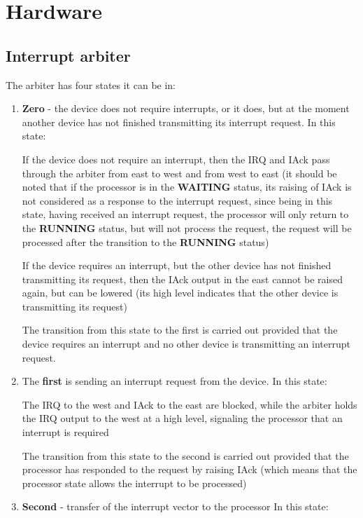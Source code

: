 \chapter*{Hardware}

\section*{Interrupt arbiter}

The arbiter has four states it can be in:

\begin{enumerate}
	\item \textbf{Zero} - the device does not require interrupts, or it does, but at the moment another device has not finished transmitting its interrupt request. In this state:

		If the device does not require an interrupt, then the IRQ and IAck pass through the arbiter from east to west and from west to east (it should be noted that if the processor is in the \textbf{WAITING} status, its raising of IAck is not considered as a response to the interrupt request, since being in this state, having received an interrupt request, the processor will only return to the \textbf{RUNNING} status, but will not process the request, the request will be processed after the transition to the \textbf{RUNNING} status)

		If the device requires an interrupt, but the other device has not finished transmitting its request, then the IAck output in the east cannot be raised again, but can be lowered (its high level indicates that the other device is transmitting its request)

		The transition from this state to the first is carried out provided that the device requires an interrupt and no other device is transmitting an interrupt request.
	\item The \textbf{first} is sending an interrupt request from the device.
		In this state:

		The IRQ to the west and IAck to the east are blocked, while the arbiter holds the IRQ output to the west at a high level, signaling the processor that an interrupt is required

		The transition from this state to the second is carried out provided that the processor has responded to the request by raising IAck (which means that the processor state allows the interrupt to be processed)
	\item \textbf{Second} - transfer of the interrupt vector to the processor
		In this state:


\end{enumerate}
